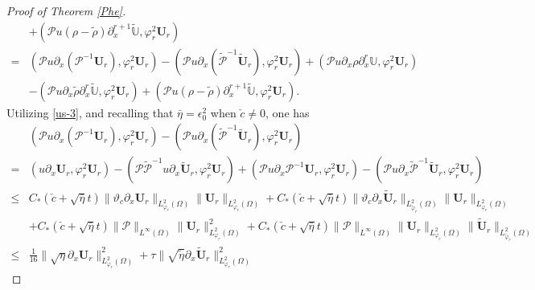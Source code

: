 \documentclass[10pt,a4paper]{amsart}
\begin{document}
\begin{proof}[Proof of Theorem \ref{Phe}]
\begin{align}
 &+(\mathcal{P}u(\rho-\tilde{\rho})\partial_{x}^{r+1}\tilde{\mathbb{U}},\varphi_{r}^{2}\mathbf{U}_{r})\nonumber\\
=& (\mathcal{P}u\partial_{x}(\mathcal{P}^{-1}\mathbf{U}_{r}),\varphi_{r}^{2}\mathbf{U}_{r})
  -(\mathcal{P}u\partial_{x}(\tilde{\mathcal{P}}^{-1}\tilde{\mathbf{U}}_{r}),\varphi_{r}^{2}\mathbf{U}_{r})
  +(\mathcal{P}u\partial_{x}\rho\partial_{x}^{r}\mathbb{U},\varphi_{r}^{2}\mathbf{U}_{r})\nonumber\\
 &-(\mathcal{P}u\partial_{x}\tilde{\rho}\partial_{x}^{r}\tilde{\mathbb{U}},\varphi_{r}^{2}\mathbf{U}_{r})
  +(\mathcal{P}u(\rho-\tilde{\rho})\partial_{x}^{r+1}\tilde{\mathbb{U}},\varphi_{r}^{2}\mathbf{U}_{r}).\nonumber
\end{align}
Utilizing \eqref{us-3}, and recalling that $\bar{\eta}=\epsilon_{0}^{2}$ when $\check{c}\neq0$, one has
\begin{align}\label{JJ111}
 &(\mathcal{P}u\partial_{x}(\mathcal{P}^{-1}\mathbf{U}_{r}),\varphi_{r}^{2}\mathbf{U}_{r})
-(\mathcal{P}u\partial_{x}(\tilde{\mathcal{P}}^{-1}\tilde{\mathbf{U}}_{r}),\varphi_{r}^{2}\mathbf{U}_{r})\\
=& (u\partial_{x}\mathbf{U}_{r},\varphi_{r}^{2}\mathbf{U}_{r})
  -(\mathcal{P}\tilde{\mathcal{P}}^{-1}u\partial_{x}\tilde{\mathbf{U}}_{r},\varphi_{r}^{2}\mathbf{U}_{r})
  +(\mathcal{P}u\partial_{x}\mathcal{P}^{-1}\mathbf{U}_{r},\varphi_{r}^{2}\mathbf{U}_{r})
  -(\mathcal{P}u\partial_{x}\tilde{\mathcal{P}}^{-1}\tilde{\mathbf{U}}_{r},\varphi_{r}^{2}\mathbf{U}_{r})\nonumber\\
\leq& C_{*}(\check{c}+\sqrt{\bar{\eta}}t)\|\vartheta_{c}\partial_{x}\mathbf{U}_{r}\|_{L_{\varphi_{r}}^{2}(\Omega)}
                                             \|\mathbf{U}_{r}\|_{L_{\varphi_{r}}^{2}(\Omega)}
     +C_{*}(\check{c}+\sqrt{\bar{\eta}}t)\|\vartheta_{c}\partial_{x}\tilde{\mathbf{U}}_{r}\|_{L_{\tilde{\varphi}_{r}}^{2}(\Omega)}\|\mathbf{U}_{r}\|_{L_{\varphi_{r}}^{2}(\Omega)}\nonumber\\
    &+C_{*}(\check{c}+\sqrt{\bar{\eta}}t)\|\mathcal{P}\|_{L^{\infty}(\Omega)}\|\mathbf{U}_{r}\|_{L_{\varphi_{r}}^{2}(\Omega)}^{2}
     +C_{*}(\check{c}+\sqrt{\bar{\eta}}t)\|\mathcal{P}\|_{L^{\infty}(\Omega)}\|\mathbf{U}_{r}\|_{L_{\varphi_{r}}^{2}(\Omega)}
                                             \|\tilde{\mathbf{U}}_{r}\|_{L_{\tilde{\varphi}_{r}}^{2}(\Omega)}\nonumber\\
\leq& \frac{1}{16}\|\sqrt{\eta}\partial_{x}\mathbf{U}_{r}\|_{L_{\varphi_{r}}^{2}(\Omega)}^{2}
     +\tau\|\sqrt{\tilde{\eta}}\partial_{x}\tilde{\mathbf{U}}_{r}\|_{L_{\varphi_{r}}^{2}(\Omega)}^{2}

\end{align}
\end{proof}
\end{document}
